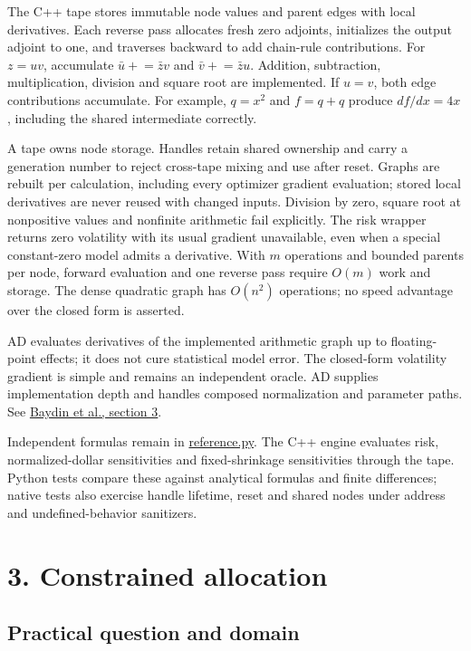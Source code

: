 \documentclass[
  american,
  11pt,
]{article}
\begin{document}
The C++ tape stores immutable node values and parent edges with local
derivatives. Each reverse pass allocates fresh zero adjoints,
initializes the output adjoint to one, and traverses backward to add
chain-rule contributions. For \(z=u v\), accumulate
\(\bar u\mathrel{+}=\bar z v\) and \(\bar v\mathrel{+}=\bar z u\).
Addition, subtraction, multiplication, division and square root are
implemented. If \(u=v\), both edge contributions accumulate. For
example, \(q=x^2\) and \(f=q+q\) produce \(df/dx=4x\), including the
shared intermediate correctly.

A tape owns node storage. Handles retain shared ownership and carry a
generation number to reject cross-tape mixing and use after reset.
Graphs are rebuilt per calculation, including every optimizer gradient
evaluation; stored local derivatives are never reused with changed
inputs. Division by zero, square root at nonpositive values and
nonfinite arithmetic fail explicitly. The risk wrapper returns zero
volatility with its usual gradient unavailable, even when a special
constant-zero model admits a derivative. With \(m\) operations and
bounded parents per node, forward evaluation and one reverse pass
require \(O(m)\) work and storage. The dense quadratic graph has
\(O(n^2)\) operations; no speed advantage over the closed form is
asserted.

AD evaluates derivatives of the implemented arithmetic graph up to
floating-point effects; it does not cure statistical model error. The
closed-form volatility gradient is simple and remains an independent
oracle. AD supplies implementation depth and handles composed
normalization and parameter paths. See
\href{https://jmlr.org/papers/volume18/17-468/17-468.pdf}{Baydin et al.,
section 3}.

Independent formulas remain in
\href{https://github.com/eshangark/portfolio-risk-engine/blob/main/src/portfolio_risk/reference.py}{reference.py}.
The C++ engine evaluates risk, normalized-dollar sensitivities and
fixed-shrinkage sensitivities through the tape. Python tests compare
these against analytical formulas and finite differences; native tests
also exercise handle lifetime, reset and shared nodes under address and
undefined-behavior sanitizers.

\section{3. Constrained allocation}\label{constrained-allocation}

\subsection{Practical question and
domain}\label{practical-question-and-domain}
\end{document}
